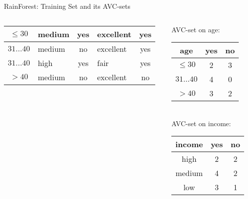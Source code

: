 \begin{frame}{RainForest: Training Set and its AVC-sets}
\begin{columns}
\begin{column}{0.6\textwidth}
\begin{tabular}{|c|l|c|l|c|}
				\cellcolor{yellow!20}$\leq30$     & \cellcolor{yellow!20}medium & \cellcolor{yellow!20}yes   & \cellcolor{yellow!20}excellent    & \cellcolor{green!20}yes            \\\hline
				\cellcolor{yellow!20}$31\ldots40$ & \cellcolor{yellow!20}medium & \cellcolor{yellow!20}no    & \cellcolor{yellow!20}excellent    & \cellcolor{green!20}yes            \\\hline
				\cellcolor{yellow!20}$31\ldots40$ & \cellcolor{yellow!20}high   & \cellcolor{yellow!20}yes   & \cellcolor{yellow!20}fair         & \cellcolor{green!20}yes            \\\hline
				\cellcolor{yellow!20}$>40$        & \cellcolor{yellow!20}medium & \cellcolor{yellow!20}no    & \cellcolor{yellow!20}excellent    & \cellcolor{red!20}no               \\\hline
			\end{tabular}
		\end{column}
		\begin{column}{0.3\textwidth}
			\vspace{-3cm}

			\centering
			AVC-set on age:\\
			\begin{tabular}{|c|c|c|}
				\hline
				age          & yes & no \\\hline
				$\leq 30$    & 2   & 3  \\\hline
				$31\ldots40$ & 4   & 0  \\\hline
				$>40$        & 3   & 2  \\\hline
			\end{tabular}\\[1cm]
			AVC-set on income:\\
			\begin{tabular}{|c|c|c|}
				\hline
				income & yes & no \\\hline
				high   & 2   & 2  \\\hline
				medium & 4   & 2  \\\hline
				low    & 3   & 1  \\\hline
			\end{tabular}
		\end{column}
	\end{columns}
\end{frame}

